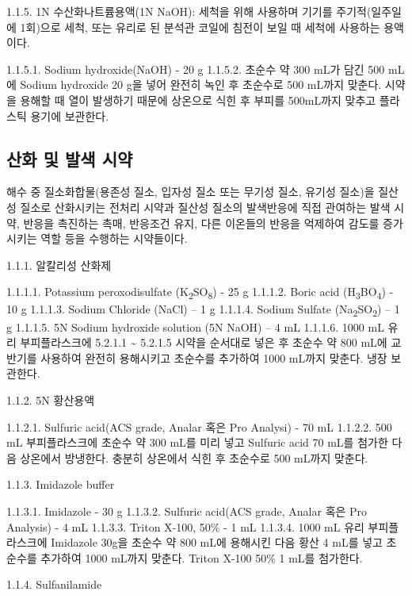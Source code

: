 \documentclass[
]{book}
\begin{document}
1.1.5. 1N 수산화나트륨용액(1N NaOH): 세척을 위해 사용하며 기기를 주기적(일주일에 1회)으로 세척, 또는 유리로 된 분석관 코일에 침전이 보일 때 세척에 사용하는 용액이다.

1.1.5.1. Sodium hydroxide(NaOH) - 20 g
1.1.5.2. 초순수 약 300 mL가 담긴 500 mL에 Sodium hydroxide 20 g을 넣어 완전히 녹인 후 초순수로 500 mL까지 맞춘다. 시약을 용해할 때 열이 발생하기 때문에 상온으로 식힌 후 부피를 500mL까지 맞추고 플라스틱 용기에 보관한다.

\hypertarget{uxc0b0uxd654-uxbc0f-uxbc1cuxc0c9-uxc2dcuxc57d}{%
\subsection{산화 및 발색 시약}\label{uxc0b0uxd654-uxbc0f-uxbc1cuxc0c9-uxc2dcuxc57d}}

해수 중 질소화합물(용존성 질소, 입자성 질소 또는 무기성 질소, 유기성 질소)을 질산성 질소로 산화시키는 전처리 시약과 질산성 질소의 발색반응에 직접 관여하는 발색 시약, 반응을 촉진하는 촉매, 반응조건 유지, 다른 이온들의 반응을 억제하여 감도를 증가시키는 역할 등을 수행하는 시약들이다.

1.1.1. 알칼리성 산화제

1.1.1.1. Potassium peroxodisulfate (K\textsubscript{2}SO\textsubscript{8}) - 25 g
1.1.1.2. Boric acid (H\textsubscript{3}BO\textsubscript{4}) - 10 g
1.1.1.3. Sodium Chloride (NaCl) -- 1 g
1.1.1.4. Sodium Sulfate (Na\textsubscript{2}SO\textsubscript{2}) -- 1 g
1.1.1.5. 5N Sodium hydroxide solution (5N NaOH) -- 4 mL
1.1.1.6. 1000 mL 유리 부피플라스크에 5.2.1.1 \textasciitilde{} 5.2.1.5 시약을 순서대로 넣은 후 초순수 약 800 mL에 교반기를 사용하여 완전히 용해시키고 초순수를 추가하여 1000 mL까지 맞춘다. 냉장 보관한다.

1.1.2. 5N 황산용액

1.1.2.1. Sulfuric acid(ACS grade, Analar 혹은 Pro Analysi) - 70 mL
1.1.2.2. 500 mL 부피플라스크에 초순수 약 300 mL를 미리 넣고 Sulfuric acid 70 mL를 첨가한 다음 상온에서 방냉한다. 충분히 상온에서 식힌 후 초순수로 500 mL까지 맞춘다.

1.1.3. Imidazole buffer

1.1.3.1. Imidazole - 30 g
1.1.3.2. Sulfuric acid(ACS grade, Analar 혹은 Pro Analysis) - 4 mL
1.1.3.3. Triton X-100, 50\% - 1 mL
1.1.3.4. 1000 mL 유리 부피플라스크에 Imidazole 30g을 초순수 약 800 mL에 용해시킨 다음 황산 4 mL를 넣고 초순수를 추가하여 1000 mL까지 맞춘다. Triton X-100 50\% 1 mL를 첨가한다.

1.1.4. Sulfanilamide
\end{document}
